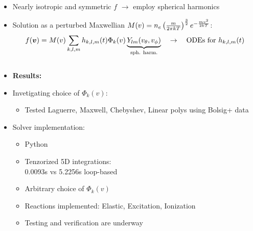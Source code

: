 \documentclass[mathserif, aspectratio=169]{beamer}
\newcommand{\vect}[1]{\boldsymbol{#1}}
\newcommand{\of}[1]{\mleft( #1 \mright)}
\newcommand{\vth}{v_{\textrm{th}}}
\begin{document}
\begin{frame}
{\begin{columns}[T]
\begin{column}{.71\linewidth}
\begin{itemize}
\begin{itemize}
\item Nearly isotropic and symmetric $f$ $\rightarrow$ employ spherical harmonics
\item Solution as a perturbed Maxwellian $M\of{v} = n_e \left( \frac{m}{2 \pi kT }\right)^{\frac32} e^{-\frac{mv^2}{2kT}}$: 
\begin{align*}
f\of{\vect{v}}
= M\of{v} \sum_{k,l,m} h_{k,l,m} \of{t} \Phi_k\of{v} \underbrace{Y_{lm}\of{v_\theta, v_\phi}}_{\tiny\text{sph. harm.}}
\quad \rightarrow \quad \text{ODEs for } h_{k,l,m} \of{t}
\end{align*}
\end{itemize}
\end{itemize}
\begin{columns}[T]
\begin{column}{.5\linewidth}
\begin{itemize}
\item[] \textbf{Results:}
\item Invetigating choice of $\Phi_k(v)$:
\begin{itemize}
\item Tested Laguerre, Maxwell, Chebyshev, Linear polys using Bolsig+ data
\end{itemize}
\item Solver implementation:
\begin{itemize}
\item Python
\item Tenzorized 5D integrations: \\0.0093s vs 5.2256s loop-based
\item Arbitrary choice of $\Phi_k(v)$
\item Reactions implemented:
Elastic, Excitation, Ionization
\item Testing and verification are underway
\end{itemize}
\end{itemize}
\end{column}

\end{columns}
\end{column}
\end{columns}}
\end{frame}
\end{document}
